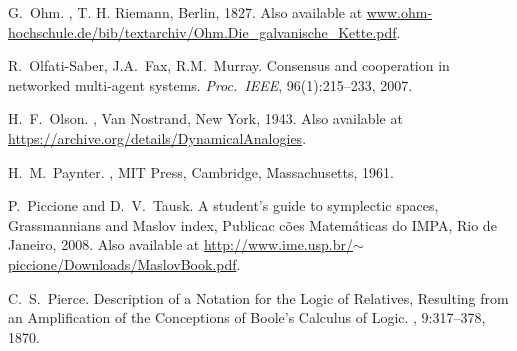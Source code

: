 \begin{thebibliography}{RSW00}
    G.\ Ohm.
    ,
    T. H. Riemann, Berlin, 1827.
    \newblock Also available at
    \href{http://www.ohm-hochschule.de/bib/textarchiv/Ohm.Die_galvanische_Kette.pdf}{www.ohm-hochschule.de/bib/textarchiv/Ohm.Die\_galvanische\_Kette.pdf}.

    R.\ Olfati-Saber, J.A.\ Fax, R.M.\ Murray.
    \newblock Consensus and cooperation in networked multi-agent systems.
    \newblock \emph{Proc.\ IEEE}, 96(1):215--233, 2007.

    H.\ F.\ Olson.
    , Van
    Nostrand, New York, 1943.
    \newblock Also available at 
    \href{https://archive.org/details/DynamicalAnalogies}
    {https://archive.org/details/DynamicalAnalogies}.


    H.\ M.\ Paynter.
    , MIT Press, Cambridge, Massachusetts, 1961.


    P.\ Piccione and D.\ V.\ Tausk.
    \newblock A student's guide to symplectic
    spaces, Grassmannians and Maslov index, Publicac c\~oes Matem\'aticas do
    IMPA, Rio de Janeiro, 2008.
    \newblock Also available at
    \href{http://www.ime.usp.br/~piccione/Downloads/MaslovBook.pdf}
    {http://www.ime.usp.br/$\sim$piccione/Downloads/MaslovBook.pdf}.

    C.\ S.\ Pierce.
    \newblock Description of a Notation for the Logic of Relatives, Resulting
    from an Amplification of the Conceptions of Boole's Calculus of Logic.
    ,
    9:317--378, 1870. 



\end{thebibliography}
